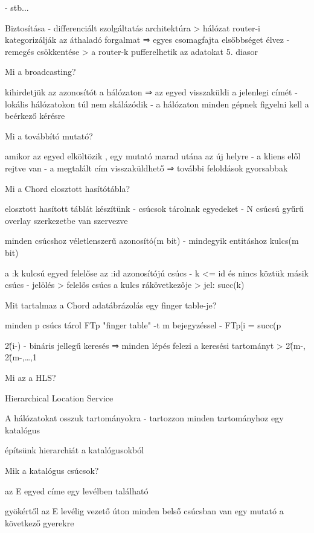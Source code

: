 \documentclass[twoside, a4paper, 12pt]{article}
\begin{document}
\begin{description}
        - stb...
    \item Biztosítása
        - differenciált szolgáltatás architektúra
        > hálózat router-i kategorizálják az áthaladó forgalmat 
        ⇒ egyes csomagfajta elsőbbséget élvez
        - remegés csökkentése
        > a router-k pufferelhetik az adatokat
        5. diasor
    \item  Mi a broadcasting?
    \item kihirdetjük az azonosítót a hálózaton ⇒ az egyed visszaküldi a jelenlegi címét
        - lokális hálózatokon túl nem skálázódik
        - a hálózaton minden gépnek figyelni kell a beérkező kérésre 
    \item  Mi a továbbító mutató?
    \item amikor az egyed elköltözik , egy mutató marad utána az új helyre
        - a kliens elől rejtve van
        - a megtalált cím visszaküldhető ⇒ további feloldások gyorsabbak
    \item  Mi a Chord elosztott hasítótábla?
    \item elosztott hasított táblát készítünk
        - csúcsok tárolnak egyedeket
        - N csúcsú gyűrű overlay szerkezetbe van szervezve
    \item minden csúcshoz véletlenszerű azonosító(m bit)
        - mindegyik entitáshoz kulcs(m bit)
    \item a :k kulcsú egyed felelőse az :id azonosítójú csúcs
        - k <= id és nincs köztük másik csúcs
        - jelölés
        > felelős csúcs a kulcs rákövetkezője
        > jel: succ(k)
    \item  Mit tartalmaz a Chord adatábrázolás egy finger table-je?
    \item minden p csúcs tárol FTp "finger table" -t m bejegyzéssel
        - FTp[i = succ(p\item2\^(i-)
            - bináris jellegű keresés ⇒ minden lépés felezi a keresési tartományt
            > 2\^(m-, 2\^(m-,\ldots,1
        \item  Mi az a HLS?
        \item Hierarchical Location Service
        \item A hálózatokat osszuk tartományokra
            - tartozzon minden tartományhoz egy katalógus
        \item építsünk hierarchiát a katalógusokból
        \item  Mik a katalógus csúcsok?
        \item az E egyed címe egy levélben található
        \item gyökértől az E levélig vezető úton minden belső csúcsban van egy mutató a következő gyerekre

\end{description}
\end{document}
